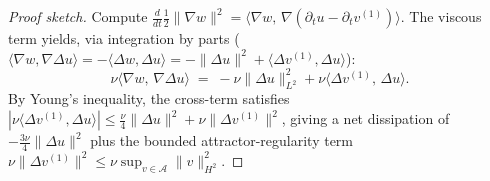 \documentclass[12pt,a4paper]{article}
\theoremstyle{definition}
\theoremstyle{plain}
\theoremstyle{remark}
\begin{document}
\begin{proof}[Proof sketch]
Compute $\frac{d}{dt}\frac{1}{2}\|\nabla w\|^2
= \langle \nabla w,\,\nabla(\partial_t u - \partial_t v^{(1)})\rangle$.
The viscous term yields, via integration by parts
($\langle \nabla w, \nabla\Delta u\rangle
= -\langle \Delta w, \Delta u\rangle
= -\|\Delta u\|^2 + \langle \Delta v^{(1)}, \Delta u\rangle$):
\[
  \nu\langle \nabla w,\, \nabla\Delta u \rangle
  \;=\; -\nu\|\Delta u\|_{L^2}^2
        + \nu\langle \Delta v^{(1)},\, \Delta u \rangle.
\]
By Young's inequality, the cross-term satisfies
$|\nu\langle \Delta v^{(1)}, \Delta u\rangle|
\le \frac{\nu}{4}\|\Delta u\|^2 + \nu\|\Delta v^{(1)}\|^2$,
giving a net dissipation of $-\frac{3\nu}{4}\|\Delta u\|^2$
plus the bounded attractor-regularity term
$\nu\|\Delta v^{(1)}\|^2 \le \nu\sup_{v\in\mathcal{A}}\|v\|_{H^2}^2$.


\end{proof}
\end{document}
